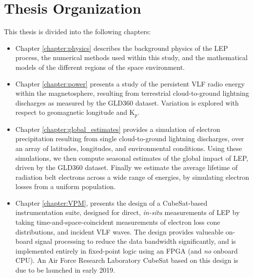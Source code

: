 \section{Thesis Organization}
This thesis is divided into the following chapters:
\begin{itemize}
\item Chapter \ref{chapter:physics} describes the background physics of the LEP process, the numerical methods used within this study, and the mathematical models of the different regions of the space environment. 
\item Chapter \ref{chapter:power} presents a study of the persistent VLF radio energy within the magnetosphere, resulting from terrestrial cloud-to-ground lightning discharges as measured by the GLD360 dataset. Variation is explored with respect to geomagnetic longitude and K$_p$. 
\item Chapter \ref{chapter:global_estimates} provides a simulation of electron precipitation resulting from single cloud-to-ground lightning discharges, over an array of latitudes, longitudes, and environmental conditions. Using these simulations, we then compute seasonal estimates of the global impact of LEP, driven by the GLD360 dataset. Finally we estimate the average lifetime of radiation belt electrons across a wide range of energies, by simulating electron losses from a uniform population.

\item Chapter \ref{chapter:VPM}, presents the design of a CubeSat-based instrumentation suite, designed for direct, \emph{in-situ} measurements of LEP by taking time-and-space-coincident measurements of electron loss cone distributions, and incident VLF waves. The design provides valueable on-board signal processing to reduce the data bandwidth significantly, and is implemented entirely in fixed-point logic using an FPGA (and \emph{no} onboard CPU). An Air Force Research Laboratory CubeSat based on this design is due to be launched in early 2019.
\end{itemize}


